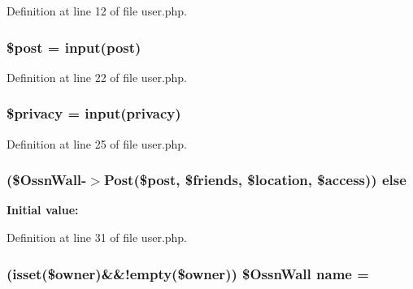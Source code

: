 Definition at line 12 of file user.\+php.

\subsubsection[{\texorpdfstring{\$post}{$post}}]{\setlength{\rightskip}{0pt plus 5cm}\$post = {\bf input}(\textquotesingle{}post\textquotesingle{})}\hypertarget{user_8php_a53d6c7669d97392c407c4f959a5263db}{}\label{user_8php_a53d6c7669d97392c407c4f959a5263db}


Definition at line 22 of file user.\+php.

\subsubsection[{\texorpdfstring{\$privacy}{$privacy}}]{\setlength{\rightskip}{0pt plus 5cm}\$privacy = {\bf input}(\textquotesingle{}privacy\textquotesingle{})}\hypertarget{user_8php_add279b6d3dad18665dc1d892af5e6b26}{}\label{user_8php_add279b6d3dad18665dc1d892af5e6b26}


Definition at line 25 of file user.\+php.

\subsubsection[{\texorpdfstring{else}{else}}]{ (\${\bf Ossn\+Wall}-\/$>$Post(\$post, \$friends, \${\bf location}, \$access)) else}\hypertarget{user_8php_adb2d35e2a6bf03c66a3061c7fb3066f2}{}\label{user_8php_adb2d35e2a6bf03c66a3061c7fb3066f2}
{\bfseries Initial value\+:}


Definition at line 31 of file user.\+php.

\subsubsection[{\texorpdfstring{name}{name}}]{ (isset(\$owner)\&\&!empty(\$owner)) \${\bf Ossn\+Wall} name = \textquotesingle{}}\hypertarget{user_8php_a765af5e9671743530143a6d3670fd9a6}{}\label{user_8php_a765af5e9671743530143a6d3670fd9a6}


